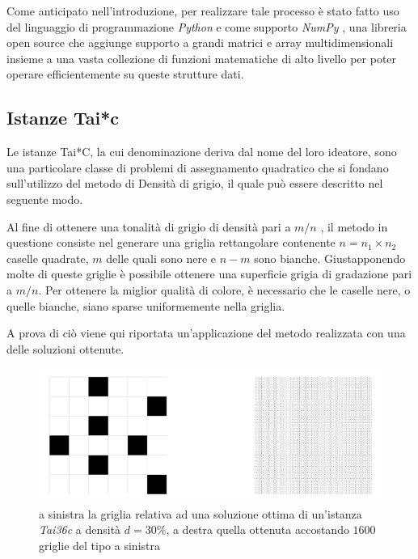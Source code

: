 Come anticipato nell'introduzione, per realizzare tale processo è stato fatto uso del linguaggio di programmazione \textit{Python} 
\cite{python} e come supporto \textit{NumPy} \cite{NumPy}, una libreria open source che aggiunge supporto a grandi matrici 
e array multidimensionali insieme a una vasta collezione di funzioni matematiche di alto livello per poter operare efficientemente 
su queste strutture dati.

\subsection{Istanze Tai*c}
\label{subsec:taic}
Le istanze Tai*C, la cui denominazione deriva dal nome del loro ideatore, sono una particolare classe di problemi di assegnamento quadratico
che si fondano sull'utilizzo del metodo di Densità di grigio, il quale può essere descritto nel seguente modo.

Al fine di ottenere una tonalità di grigio di densità pari a $m/n$ , il metodo in questione consiste nel generare una griglia 
rettangolare contenente $n = n_1 \times n_2$ caselle quadrate, $m$ delle quali sono nere e $n-m$ sono bianche. 
Giustapponendo molte di queste griglie è possibile ottenere una superficie grigia di gradazione pari a $m/n$.
Per ottenere la miglior qualità di colore, è necessario che le caselle nere, o quelle bianche, siano sparse uniformemente nella griglia.

A prova di ciò viene qui riportata un'applicazione del metodo realizzata con una delle soluzioni ottenute.
\begin{figure}[h!]
    \centering
    \includegraphics[scale=0.21]{images/Density_of_Grey.png}
    \caption{a sinistra la griglia relativa ad una soluzione ottima di un'istanza \textit{Tai36c} a densità $d=30\%$, 
             \newline a destra quella ottenuta accostando $1600$ griglie del tipo a sinistra}
    \label{fig:dnsgry}
\end{figure}


